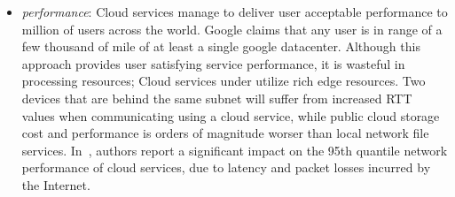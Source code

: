\begin{itemize}
\item {\it performance}: Cloud services manage to deliver user acceptable
      performance to million of users across the world. Google claims that any
      user is in range of a few thousand of mile of at least a single google
      datacenter. Although this approach provides user satisfying service
      performance, it is wasteful in processing resources; Cloud services under
      utilize rich edge resources. Two devices that are behind the same subnet
      will suffer from increased RTT values when communicating using a cloud service,
      while public cloud storage cost and performance is orders of magnitude
      worser than local network file services. In~\cite{Wittie2010}, authors
      report a significant impact on the 95th quantile network
      performance of cloud services, due to latency and packet losses incurred
      by the Internet. 


\end{itemize}
